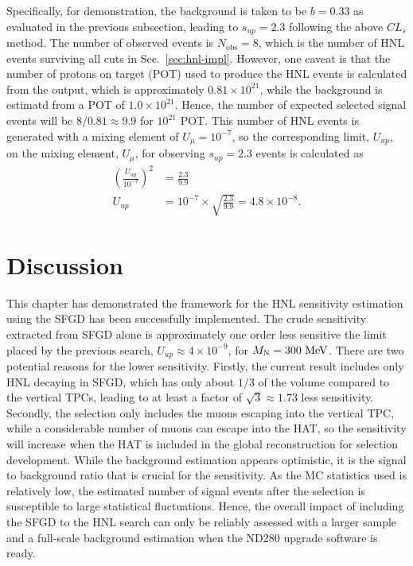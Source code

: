         Specifically, for demonstration, the background is taken to be $b=0.33$ as evaluated in the previous subsection, leading to $s_{up}=2.3$ following the above $CL_s$ method.
        The number of observed events is $N_{\textrm{obs}}=8$, which is the number of HNL events surviving all cuts in Sec.~\ref{sec:hnl-impl}.
        However, one caveat is that the number of protons on target (POT) used to produce the HNL events is calculated from the  output, which is approximately $0.81\times10^{21}$, while the background is estimatd from a POT of $1.0\times10^{21}$.
        Hence, the number of expected selected signal events will be $8/0.81\approx9.9$ for $10^{21}$ POT.
        This number of HNL events is generated with a mixing element of $U_{\mu} = 10^{-7}$, so the corresponding limit, $U_{up}$, on the mixing element, $U_{\mu}$, for observing $s_{up}=2.3$ events is calculated as 
        \begin{align}
            \left(\frac{U_{up}}{10^{-7}}\right)^2 & =  \frac{2.3}{9.9} \\
            U_{up} & = 10^{-7} \times \sqrt{\frac{2.3}{9.9}} = 4.8\times10^{-8}.
        \end{align}

    \section{Discussion}
        This chapter has demonstrated the framework for the HNL sensitivity estimation using the SFGD has been successfully implemented.
        The crude sensitivity extracted from SFGD alone is approximately one order less sensitive the limit placed by the previous search, $U_{up}\approx4\times10^{-9}$, for $M_{\textrm{N}}=300~\textrm{MeV}$.
        There are two potential reasons for the lower sensitivity.
        Firstly, the current result includes only HNL decaying in SFGD, which has only about $1/3$ of the volume compared to the vertical TPCs, leading to at least a factor of $\sqrt{3}\approx1.73$ less sensitivity.
        Secondly, the selection only includes the muons escaping into the vertical TPC, while a considerable number of muons can escape into the HAT, so the sensitivity will increase when the HAT is included in the global reconstruction for selection development.
        While the background estimation appears optimistic, it is the signal to background ratio that is crucial for the sensitivity.
        As the MC statistics used is relatively low, the estimated number of signal events after the selection is susceptible to large statistical fluctuations. 
        Hence, the overall impact of including the SFGD to the HNL search can only be reliably assessed 
        with a larger sample and a full-scale background estimation when the ND280 upgrade software is ready.
        
